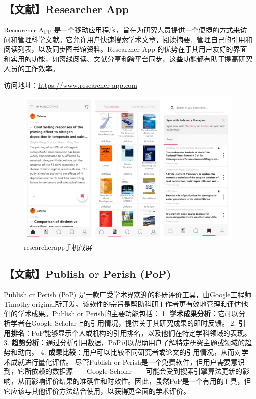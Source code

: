 \documentclass[
]{ctexbook}
\begin{document}
\hypertarget{ux6587ux732eresearcher-app}{%
\subsection{【文献】Researcher App}\label{ux6587ux732eresearcher-app}}

Researcher App 是一个移动应用程序，旨在为研究人员提供一个便捷的方式来访问和管理科学文献。它允许用户快速搜索学术文章，阅读摘要，管理自己的引用和阅读列表，以及同步图书馆资料。Researcher App 的优势在于其用户友好的界面和实用的功能，如离线阅读、文献分享和跨平台同步，这些功能都有助于提高研究人员的工作效率。

访问地址：\url{https://www.researcher-app.com}

\begin{figure}
\centering
\includegraphics{Fig/skill/researcherapp.png}
\caption{researcherapp手机截屏}
\end{figure}

\hypertarget{ux6587ux732epublish-or-perish-pop}{%
\subsection{【文献】Publish or Perish (PoP)}\label{ux6587ux732epublish-or-perish-pop}}

Publish or Perish (PoP) 是一款广受学术界欢迎的科研评价工具，由Google工程师Timothy original所开发。该软件的宗旨是帮助科研工作者更有效地管理和评估他们的学术成果。Publish or Perish的主要功能包括：
1. \textbf{学术成果分析}：它可以分析学者在Google Scholar上的引用情况，提供关于其研究成果的即时反馈。
2. \textbf{引用排名}：PoP能够显示个人或机构的引用排名，以及他们在特定学科领域的表现。
3. \textbf{趋势分析}：通过分析引用数据，PoP可以帮助用户了解特定研究主题或领域的趋势和动向。
4. \textbf{成果比较}：用户可以比较不同研究者或论文的引用情况，从而对学术成就进行量化评估。
尽管Publish or Perish是一个免费软件，但用户需要意识到，它所依赖的数据源------Google Scholar------可能会受到搜索引擎算法更新的影响，从而影响评价结果的准确性和时效性。因此，虽然PoP是一个有用的工具，但它应该与其他评价方法结合使用，以获得更全面的学术评价。
\end{document}
